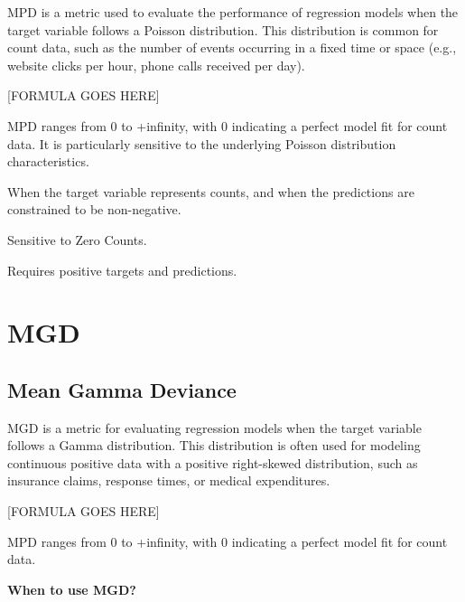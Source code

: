 MPD is a metric used to evaluate the performance of regression models when the target variable follows a Poisson distribution. This distribution is common for count data, such as the number
of events occurring in a fixed time or space (e.g., website clicks per hour, phone calls received per day).

\begin{center}
    [FORMULA GOES HERE]
\end{center}

MPD ranges from 0 to +infinity, with 0 indicating a perfect model fit for count data. It is particularly sensitive to the underlying Poisson distribution characteristics.


When the target variable represents counts, and when the predictions are constrained to be non-negative.

{
    \item Sensitive to Zero Counts.
    \item Requires positive targets and predictions.
}

\clearpage
\thispagestyle{regressionstyle}
\section{MGD}
\subsection{Mean Gamma Deviance}

MGD is a metric for evaluating regression models when the target variable follows a Gamma distribution. This distribution is often used for modeling continuous positive data with a
positive right-skewed distribution, such as insurance claims, response times, or medical expenditures.

\begin{center}
    [FORMULA GOES HERE]
\end{center}

MPD ranges from 0 to +infinity, with 0 indicating a perfect model fit for count data.

\textbf{When to use MGD?}

